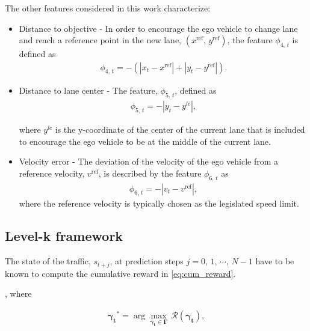 \documentclass[10pt,journal]{IEEEtran}
\begin{document}
	 The other features considered in this work characterize:
	 \begin{itemize}
	 	\item Distance to objective - In order to encourage the ego vehicle to change lane and reach a reference point in the new lane, $\left(x^{\textrm{ref}},\,y^{\textrm{ref}}\right)$, the feature $\phi_{4,\,{t}} $ is defined as
	 	\begin{align}
	 		\phi_{4,\,{t}}  = -\left(\left|x_{t}-x^{\textrm{ref}}\right| + \left|y_{t}-y^{\textrm{ref}}\right|\right).
	 	\end{align}
	 	
	 	\item Distance to lane center - The feature, $\phi_{5,\,{t}} $, defined as 
	 	 \begin{align}
	 	 \phi_{5,\,{t}}  = - \left|y_{t}-y^{lc}\right|,
	 	 \end{align}
	 	 
	 	 \noindent where $y^{lc}$ is the y-coordinate of the center of the current lane that is included to encourage the ego vehicle to be at the middle of the current lane.
	 	 
	 	\item Velocity error - The deviation of the velocity of the ego vehicle from a reference velocity, $v^{\textrm{ref}}$, is described by the feature $\phi_{6,\,{t}}$ as
	 	\begin{align}
	 		\phi_{6,\,{t}} = - \left|v_{t}-v^{\textrm{ref}}\right|,
	 	\end{align}
	 	where the reference velocity is typically chosen as the legislated speed limit.
	 \end{itemize}
 
 
 	\subsection{Level-k framework}
 	\label{sec:level_k}
 	
 	
 	
 	
 	The state of the traffic, $s_{t+j}$, at prediction steps $j=0,\,1,\,\cdots,\,N-1$ have to be known to compute the cumulative reward in \eqref{eq:cum_reward}.
 	
 	
 	, where 
 	
 	\begin{align}
 	\boldsymbol{\gamma_{t}}^* = \arg \underset {\boldsymbol{\gamma_{t}} \in  \boldsymbol{\Gamma}} {\max}\, \mathcal{R}\left(\boldsymbol{\gamma_{t}}\right),
 	\end{align}
 	
\end{document}
